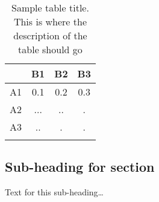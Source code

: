 \documentclass{bmcart}
\begin{document}
		
		
		\begin{table}[h!]
			\caption{Sample table title. This is where the description of the table should go}
			\begin{tabular}{cccc}
				\hline
				& B1  &B2   & B3\\ 
				\hline
				A1 & 0.1 & 0.2 & 0.3\\
				A2 & ... & ..  & .\\
				A3 & ..  & .   & .\\ 
				\hline
				\label{tab:ejemplo}
			\end{tabular}
		\end{table}
				
		\subsection*{Sub-heading for section}
			Text for this sub-heading\ldots
	
\end{document}
